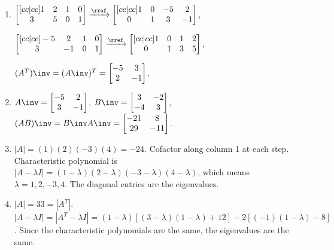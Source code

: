 {\begin{multicols}{2}
\begin{enumerate}
\begin{enumerate}
	Coord. of $(1,2,0,4)$ are $(1,2)$.
	Coord. of $(2,3,-1,0)$ are $(2,3)$.
	Coord. of $(3,5,-1,4)$ are $(3,5)$.
	(These coordinates come from the rows of the pivot columns.)

  \item  
  $
  \begin{bmatrix}[cc|cc]
	1 & 2 & 1 & 0 \\
	3 & 5 & 0 & 1
	\end{bmatrix}
	\xrightarrow{\rref}
  \begin{bmatrix}[cc|cc]
	1 & 0 & -5 & 2 \\
	0 & 1 & 3 & -1
	\end{bmatrix}
	$,
	
  $
  \begin{bmatrix}[cc|cc]
	-5 & 2 & 1 & 0 \\
	3 & -1 & 0 & 1
	\end{bmatrix}
	\xrightarrow{\rref}
  \begin{bmatrix}[cc|cc]
	1 & 0 & 1 & 2 \\
	0 & 1 & 3 & 5
	\end{bmatrix}
	$,
	  
	$(A^T)\inv = (A\inv)^T = 
  \begin{bmatrix}
	 -5 & 3 \\
	 2 & -1
	\end{bmatrix}
	$.


  \item 
  $A\inv = \begin{bmatrix}
	-5 & 2 \\
	3 & -1
	\end{bmatrix}$, 
	$B\inv=\begin{bmatrix}
	3 & -2 \\
	-4 & 3
	\end{bmatrix}$, 
	$(AB)\inv = B\inv A\inv=\begin{bmatrix}
	-21 & 8 \\
	29 & -11
	\end{bmatrix}$. 


  \item  
$|A| = (1)(2)(-3)(4) = -24$. Cofactor along column 1 at each step. Characteristic polynomial is 
$|A-\lambda I| = (1-\lambda)(2-\lambda)(-3-\lambda)(4-\lambda)$, which means $\lambda = 1,2,-3,4$. The diagonal entries are the eigenvalues.
  
  \item $|A| = 33 = |A^T|$. 
  $|A-\lambda I|=|A^T-\lambda I| = (1-\lambda)[(3-\lambda)(1-\lambda)+12]-2[(-1)(1-\lambda)-8]$. Since the characteristic polynomials are the same, the eigenvalues are the same. 
  

\end{enumerate}
\end{enumerate}
\end{multicols}}
